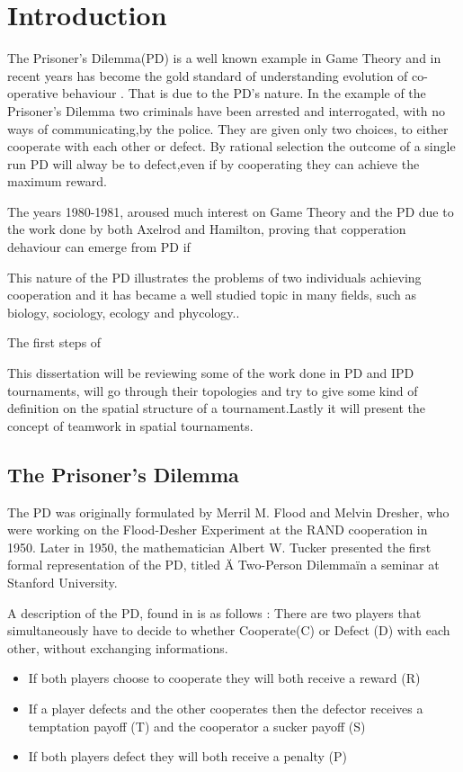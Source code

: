 \chapter{Introduction}

The Prisoner's Dilemma(PD) is a well known example in Game Theory and in recent
years has become the gold standard of understanding evolution of
co-operative behaviour \parencite{Lorberbaum1994}. That is due to the PD's nature.
In the example of the Prisoner's Dilemma two criminals have been arrested and
interrogated, with no ways of communicating,by the police.
They are given only two choices, to either cooperate with each other or defect.
By rational selection the outcome of a single run PD will alway be to defect,even
if by cooperating they can achieve the maximum reward.

The years 1980-1981, aroused much interest on Game Theory and the PD due to the
work done by both Axelrod and Hamilton, proving that copperation dehaviour
can emerge from PD if


This nature of the
PD illustrates the problems of two individuals achieving cooperation and it has
became a well studied topic in many fields, such as biology, sociology, ecology
and phycology.\parencite{Nowak_&_May1992}.

The first steps of


This dissertation will be reviewing some of the work done in PD and
IPD tournaments, will go through their topologies and try to give some kind of
definition on the spatial structure of a tournament.Lastly it will present the
concept of teamwork in spatial tournaments.

\section{The Prisoner's Dilemma}
The PD was originally formulated by Merril M. Flood and Melvin Dresher,
who were working on the Flood-Desher Experiment at the RAND cooperation in 1950.
Later in 1950, the mathematician Albert W. Tucker presented the first formal
representation of the PD, titled \"A Two-Person Dilemma\" in a seminar at
Stanford University\parencite{Gass2005}.

A description of the PD, found in \parencite{Li2011} is as follows :
There are two players that simultaneously have to decide to whether Cooperate(C)
or Defect (D) with each other, without exchanging informations.

\begin{itemize}
  \item If both players choose to cooperate they will both receive a reward (R)
  \item If a player defects and the other cooperates then the defector receives
  a temptation payoff (T) and the cooperator a sucker payoff (S)
  \item If both players defect they will both receive a penalty (P)
\end{itemize}

